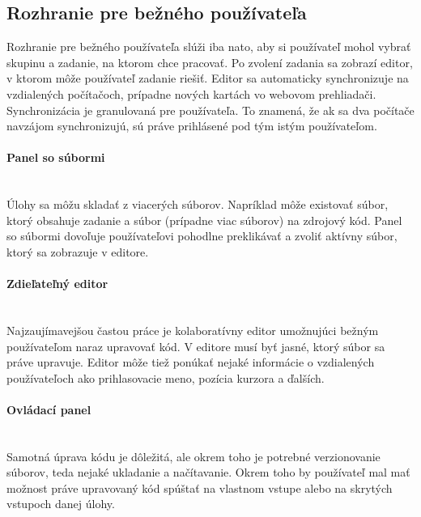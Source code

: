 \subsection{Rozhranie pre bežného používateľa}
Rozhranie pre bežného používateľa slúži iba nato, aby si používateľ mohol vybrať skupinu a zadanie,
na ktorom chce pracovať. Po zvolení zadania sa zobrazí editor, v ktorom môže používateľ zadanie
riešiť. Editor sa automaticky synchronizuje na vzdialených počítačoch, prípadne nových kartách 
vo webovom prehliadači. Synchronizácia je granulovaná pre používateľa. To znamená, že ak sa dva
počítače navzájom synchronizujú, sú práve prihlásené pod tým istým používateľom.

\paragraph{Panel so súbormi}\leavevmode\\
Úlohy sa môžu skladať z viacerých súborov. Napríklad môže existovať súbor, ktorý
obsahuje zadanie a súbor (prípadne viac súborov) na zdrojový kód. Panel so súbormi dovoľuje
používateľovi pohodlne preklikávať a zvoliť aktívny súbor, ktorý sa zobrazuje v editore.

\paragraph{Zdieľateľný editor}\leavevmode\\
Najzaujímavejšou častou práce je kolaboratívny editor umožnujúci bežným používateľom naraz upravovať
kód. V editore musí byť jasné, ktorý súbor sa práve upravuje. Editor môže tiež ponúkať nejaké
informácie o vzdialených používateľoch ako prihlasovacie meno, pozícia kurzora a ďalších.

\paragraph{Ovládací panel}\leavevmode\\
Samotná úprava kódu je dôležitá, ale okrem toho je potrebné verzionovanie
súborov, teda nejaké ukladanie a načítavanie. Okrem toho by používateľ mal mať možnost práve
upravovaný kód spúštať na vlastnom vstupe alebo na skrytých vstupoch danej úlohy.


